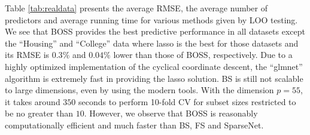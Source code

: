 Table \ref{tab:realdata} presents the average RMSE, the average number of predictors and average running time for various methods given by LOO testing. We see that BOSS provides the best predictive performance in all datasets except the ``Housing'' and ``College'' data where lasso is the best for those datasets and its RMSE is $0.3\%$ and $0.04\%$ lower than those of BOSS, respectively. Due to a highly optimized implementation of the cyclical coordinate descent, the ``glmnet'' algorithm is extremely fast in providing the lasso solution. BS is still not scalable to large dimensions, even by using the modern tools. With the dimension $p=55$, it takes around $350$ seconds to perform 10-fold CV for subset sizes restricted to be no greater than $10$. However, we observe that BOSS is reasonably computationally efficient and much faster than BS, FS and SparseNet. 




